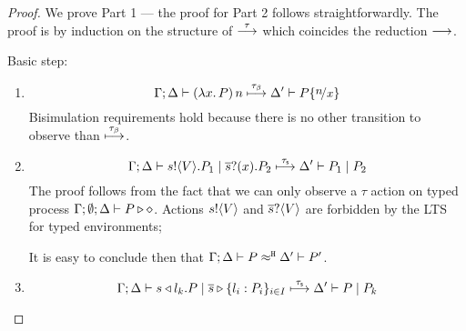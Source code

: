 

\begin{proof}
	\noi 
	We prove Part 1 --- the proof for Part 2 follows straightforwardly.
	The proof is by induction on the structure of $\stackrel{\tau}{\longrightarrow}$
	which coincides the reduction $\longrightarrow$.

	\noi Basic step:
	\begin{enumerate}
		\item %
		\[
			\horel{\Gamma}{\Delta}{\appl{(\abs{x}{P})}{n}}{\hby{\btau}}{\Delta'}{P \subst{n}{x}}
		\]
		\noi Bisimulation requirements hold because there is no other transition to observe than ${\stackrel{\tau_{\beta}}{\longmapsto}}$.

		\item %
		\[
			\Gamma; \Delta \vdash s ! \langle V \rangle . P_1 \;|\; \overline{s} ? (x) . P_2 \stackrel{\tau_{\mathsf{s}}}{\longmapsto} \Delta' \vdash P_1 \;|\; P_2
		\]
		\noi The proof follows from the fact that we can only observe a $\tau$
		action on typed process
		$\Gamma; \emptyset; \Delta \vdash P \triangleright \diamond$.
		Actions $s ! \langle V \rangle$ and $\overline{s} ? \langle V \rangle$
		are forbidden by the LTS for typed environments;

		\noi It is easy to conclude then that $\Gamma; \Delta \vdash P \approx^\mathtt{H} \Delta' \vdash P'$.

		\item %
			\[
				\Gamma; \Delta \vdash s \triangleleft l_k . P \;|\; \overline{s} \triangleright \{l_i: P_i\}_{i \in I} \stackrel{\tau_{\mathsf{s}}}{\longmapsto} \Delta' \vdash P \;|\; P_k
			\]


\end{enumerate}
\end{proof}
